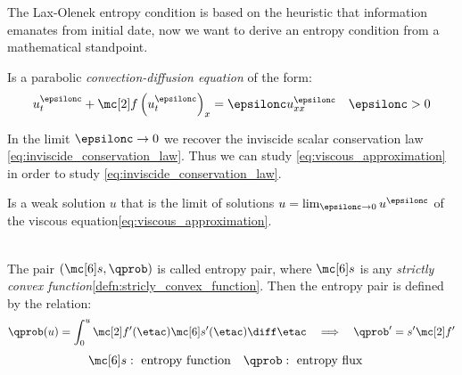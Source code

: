 \begin{sectionbox}\nospacing
    The Lax-Olenek entropy condition is based on the heuristic that information emanates from initial date, now we want to derive an entropy condition from a mathematical standpoint.
\end{sectionbox}
\begin{propositionbox}\nospacing
    \begin{proposition}\label{proposition:viscous_approximation}
        Is a parabolic \textit{convection-diffusion equation} of the form:
        \begin{align}
          u_{t}^{\epsilonc}+\flux \left(u_{t}^{\epsilonc}\right)_{x}=\epsilonc u^{\epsilonc}_{xx}&&\epsilonc>0\label{eq:viscous_approximation}
        \end{align}
    \end{proposition}
\end{propositionbox}
\begin{sectionbox}[Idea]\nospacing
    In the limit $\epsilonc\to0$ we recover the inviscide scalar conservation law \cref{eq:inviscide_conservation_law}.
    Thus we can study \cref{eq:viscous_approximation} in order to study \cref{eq:inviscide_conservation_law}.
\end{sectionbox}
\begin{defnbox}\nospacing
    \begin{defn}\label{defn:vanishing_viscosity_solution}
        Is a weak solution $u$ that is the limit of solutions $u=\lim_{\epsilonc\to0}u^{\epsilonc}$ of the viscous equation\cref{eq:viscous_approximation}.
    \end{defn}
\end{defnbox}
\begin{defnbox}\nospacing
    \begin{defn}\label{defn:entropy_function}\leavevmode\\
        The pair $(\entropy,\qprob)$ is called entropy pair, where $\entropy$ is any \textit{strictly convex function}\cref{defn:stricly_convex_function}.
        Then the entropy pair is defined by the relation:
        \begin{align}
          \qprob(u)=\int_{0}^{u}\flux'(\etac)\entropy'(\etac)\diff\etac&&\implies&&\qprob'=s'\flux'
        \end{align}
        \begin{align*}
          \entropy:\text{ entropy function}&& \qprob:\text{ entropy flux}&&
        \end{align*}
    \end{defn}
\end{defnbox}
